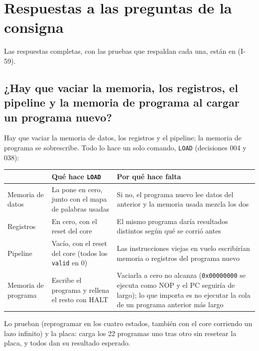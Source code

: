 \section{Respuestas a las preguntas de la consigna}
\label{sec:preguntas}

Las respuestas completas, con las pruebas que respaldan cada una, están en
 (I-59).

\subsection{¿Hay que vaciar la memoria, los registros, el pipeline y la memoria de programa al
cargar un programa nuevo?}

Hay que vaciar la memoria de datos, los registros y el pipeline; la memoria de programa se
sobrescribe. Todo lo hace un solo comando, \texttt{LOAD} (decisiones 004 y 038):

\begin{center}
\small
\begin{tabular}{@{}l p{5.2cm} p{6.2cm}@{}}
  \toprule
  & \textbf{Qué hace \texttt{LOAD}} & \textbf{Por qué hace falta} \\
  \midrule
  Memoria de datos    & La pone en cero, junto con el mapa de palabras usadas & Si no, el programa nuevo lee datos del anterior y la memoria usada mezcla los dos \\
  Registros           & En cero, con el reset del core & El mismo programa daría resultados distintos según qué se corrió antes \\
  Pipeline            & Vacío, con el reset del core (todos los \texttt{valid} en 0) & Las instrucciones viejas en vuelo escribirían memoria o registros del programa nuevo \\
  Memoria de programa & Escribe el programa y rellena el resto con HALT & Vaciarla a cero no alcanza (\texttt{0x00000000} se ejecuta como NOP y el PC seguiría de largo); lo que importa es no ejecutar la cola de un programa anterior más largo \\
  \bottomrule
\end{tabular}
\end{center}

Lo prueban  (reprogramar en los cuatro estados, también con el core corriendo
un lazo infinito) y la placa:  carga los 22 programas uno tras otro sin resetear la
placa, y todos dan su resultado esperado.


